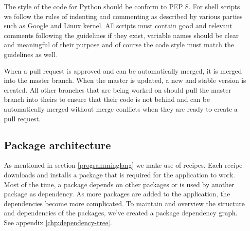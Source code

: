 The style of the code for Python should be conform to PEP 8. For shell scripts we follow the rules of indenting and commenting as described by various parties such as Google and Linux kernel.
All scripts must contain good and relevant comments following the guidelines if they exist, variable names should be clear and meaningful of their purpose and of course the code style must match the guidelines as well.

When a pull request is approved and can be automatically merged, it is merged into the master branch. When the master is updated, a new and stable version is created. All other branches that are being worked on should pull the master branch into theirs to ensure that their code is not behind and can be automatically merged without merge conflicts when they are ready to create a pull request.

\subsection{Package architecture}
As mentioned in section \ref{programminglang} we make use of recipes. Each recipe downloads and installs a package that is required for the application to work. Most of the time, a package depends on other packages or is used by another package as dependency. As more packages are added to the application, the dependencies become more complicated.
To maintain and overview the structure and dependencies of the packages, we've created a package dependency graph. See appendix \ref{chp:dependency-tree}.